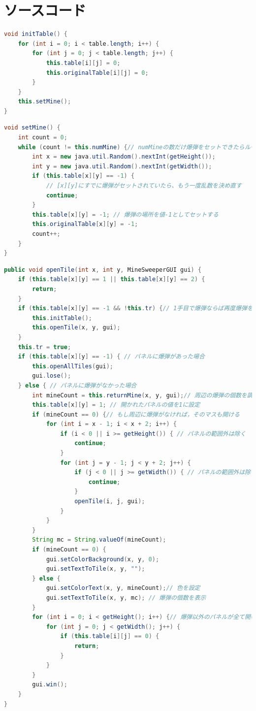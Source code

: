 \documentclass[a4j,11pt]{jsarticle}
\begin{document}
\part{ソースコード}\label{sec:ソースコード}
\noindent{}
\lstset{frame=shadowbox,numbers=left}
\begin{lstlisting}[caption=\ttfamily initTable, label=src:initTable, language=Java]
void initTable() {
    for (int i = 0; i < table.length; i++) {
        for (int j = 0; j < table.length; j++) {
            this.table[i][j] = 0;
            this.originalTable[i][j] = 0;
        }
    }
    this.setMine();
}    
\end{lstlisting}
\begin{lstlisting}[caption=\ttfamily setMine, label=src:setMine, language=Java]
void setMine() {
    int count = 0;
    while (count != this.numMine) {// numMineの数だけ爆弾をセットできたらループを抜ける
        int x = new java.util.Random().nextInt(getHeight());
        int y = new java.util.Random().nextInt(getWidth());
        if (this.table[x][y] == -1) {
            // [x][y]にすでに爆弾がセットされていたら、もう一度乱数を決め直す
            continue;
        }
        this.table[x][y] = -1; // 爆弾の場所を値-1としてセットする
        this.originalTable[x][y] = -1;
        count++;
    }
}
\end{lstlisting}
\begin{lstlisting}[caption=\ttfamily openTile, label=src:openTile, language=Java]
public void openTile(int x, int y, MineSweeperGUI gui) {
	if (this.table[x][y] == 1 || this.table[x][y] == 2) {
		return;
	}
	if (this.table[x][y] == -1 && !this.tr) {// 1手目で爆弾ならば再度爆弾をセット
		this.initTable();
		this.openTile(x, y, gui);
	}
	this.tr = true;
	if (this.table[x][y] == -1) { // パネルに爆弾があった場合
		this.openAllTiles(gui);
		gui.lose();
	} else { // パネルに爆弾がなかった場合
		int mineCount = this.returnMine(x, y, gui);// 周辺の爆弾の個数を調査
		this.table[x][y] = 1; // 開かれたパネルの値を1に設定
		if (mineCount == 0) {// もし周辺に爆弾がなければ，そのマスも開ける
			for (int i = x - 1; i < x + 2; i++) {
				if (i < 0 || i >= getHeight()) { // パネルの範囲外は除く
					continue;
				}
				for (int j = y - 1; j < y + 2; j++) {
					if (j < 0 || j >= getWidth()) { // パネルの範囲外は除く
						continue;
					}
					openTile(i, j, gui);
				}
			}
		}
		String mc = String.valueOf(mineCount);
		if (mineCount == 0) {
			gui.setColorBackground(x, y, 0);
			gui.setTextToTile(x, y, "");
		} else {
			gui.setColorText(x, y, mineCount);// 色を設定
			gui.setTextToTile(x, y, mc); // 爆弾の個数を表示
		}
		for (int i = 0; i < getHeight(); i++) {// 爆弾以外のパネルが全て開いているか確認
			for (int j = 0; j < getWidth(); j++) {
				if (this.table[i][j] == 0) {
					return;
				}
			}
		}
		gui.win();
	}
}
\end{lstlisting}
\end{document}
